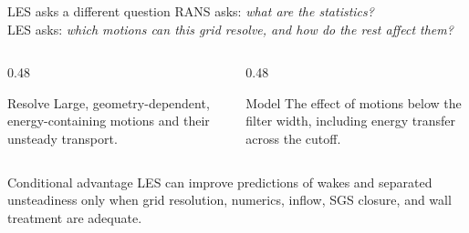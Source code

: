 \documentclass[aspectratio=169,11pt]{beamer}
\begin{document}
\begin{frame}{LES asks a different question}
RANS asks: \emph{what are the statistics?}\\[3pt]
LES asks: \emph{which motions can this grid resolve, and how do the rest affect them?}

\vspace{0.6em}
\begin{columns}[T,onlytextwidth]
\begin{column}{0.48\textwidth}
\begin{block}{Resolve}
Large, geometry-dependent, energy-containing motions and their unsteady transport.
\end{block}
\end{column}
\begin{column}{0.48\textwidth}
\begin{block}{Model}
The effect of motions below the filter width, including energy transfer across the cutoff.
\end{block}
\end{column}
\end{columns}

\begin{alertblock}{Conditional advantage}
LES can improve predictions of wakes and separated unsteadiness only when grid resolution, numerics, inflow, SGS closure, and wall treatment are adequate.
\end{alertblock}
\end{frame}
\end{document}
